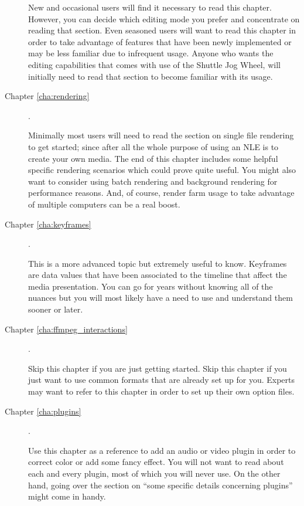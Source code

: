 \begin{description}
        New and occasional users will find it necessary to read this chapter. However, you can decide which editing mode you prefer and concentrate on reading that section. 
        Even seasoned users will want to read this chapter in order to take advantage of features that have been newly implemented or may be less familiar due to infrequent usage. 
        Anyone who wants the editing capabilities that comes with use of the Shuttle Jog Wheel, will initially need to read that section to become familiar with its usage.

    \item[Chapter \ref{cha:rendering}] .

        Minimally most users will need to read the section on single file rendering to get started; since after all the whole purpose of using an NLE is to create your own media. 
        The end of this chapter includes some helpful specific rendering scenarios which could prove quite useful. 
        You might also want to consider using batch rendering and background rendering for performance reasons. 
        And, of course, render farm usage to take advantage of multiple computers can be a real boost.

    \item[Chapter \ref{cha:keyframes}] .

        This is a more advanced topic but extremely useful to know. 
        Keyframes are data values that have been associated to the timeline that affect the media presentation. 
        You can go for years without knowing all of the nuances but you will most likely have a need to use and understand them sooner or later.

    \item[Chapter \ref{cha:ffmpeg_interactions}] .

        Skip this chapter if you are just getting started. Skip this chapter if you just want to use common
        formats that are already set up for you. Experts may want to refer to this chapter in order to set up their
        own option files.

    \item[Chapter \ref{cha:plugins}].

        Use this chapter as a reference to add an audio or video plugin in order to correct color or add some fancy effect. 
        You will not want to read about each and every plugin, most of which you will never use.  
        On the other hand, going over the section on “some specific details concerning plugins” might come in handy.


\end{description}
